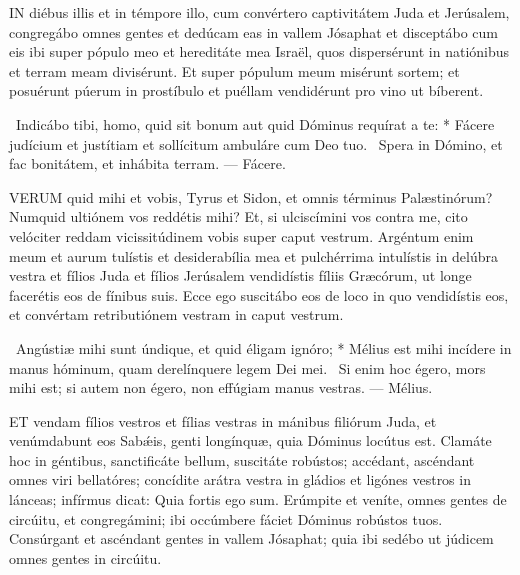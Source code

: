 


\lettrine[lines=2]{I}{N} diébus illis et in témpore illo, cum convértero captivitátem Juda et Jerúsalem, congregábo omnes gentes et dedúcam eas in vallem Jósaphat et disceptábo cum eis ibi super pópulo meo et hereditáte mea Israël, quos dispersérunt in natiónibus et terram meam divisérunt. Et super pópulum meum misérunt sortem; et posuérunt púerum in prostíbulo et puéllam vendidérunt pro vino ut bíberent.

\R\ Indicábo tibi, homo, quid sit bonum aut quid Dóminus requírat a te: * Fácere judícium et justítiam et sollícitum ambuláre cum Deo tuo. \V\ Spera in Dómino, et fac bonitátem, et inhábita terram. — Fácere.


\lettrine[lines=2]{V}{ERUM} quid mihi et vobis, Tyrus et Sidon, et omnis términus Palæstinórum? Numquid ultiónem vos reddétis mihi? Et, si ulciscímini vos contra me, cito velóciter reddam vicissitúdinem vobis super caput vestrum. Argéntum enim meum et aurum tulístis et desiderabília mea et pulchérrima intulístis in delúbra vestra et fílios Juda et fílios Jerúsalem vendidístis fíliis Græcórum, ut longe facerétis eos de fínibus suis. Ecce ego suscitábo eos de loco in quo vendidístis eos, et convértam retributiónem vestram in caput vestrum.

\R\ Angústiæ mihi sunt úndique, et quid éligam ignóro; * Mélius est mihi incídere in manus hóminum, quam derelínquere legem Dei mei. \V\ Si enim hoc égero, mors mihi est; si autem non égero, non effúgiam manus vestras. — Mélius.



\lettrine[lines=2]{E}{T} vendam fílios vestros et fílias vestras in mánibus filiórum Juda, et venúmdabunt eos Sabǽis, genti longínquæ, quia Dóminus locútus est. Clamáte hoc in géntibus, sanctificáte bellum, suscitáte robústos; accédant, ascéndant omnes viri bellatóres; concídite arátra vestra in gládios et ligónes vestros in lánceas; infírmus dicat: Quia fortis ego sum. Erúmpite et veníte, omnes gentes de circúitu, et congregámini; ibi occúmbere fáciet Dóminus robústos tuos. Consúrgant et ascéndant gentes in vallem Jósaphat; quia ibi sedébo ut júdicem omnes gentes in circúitu.

